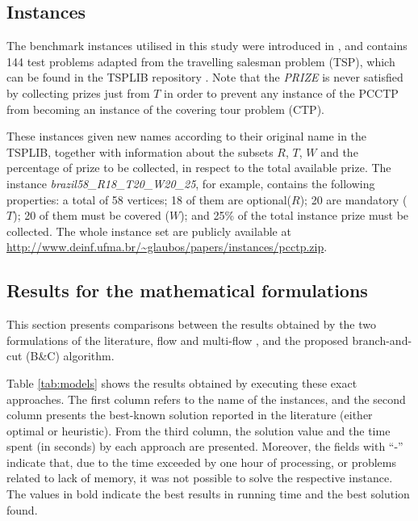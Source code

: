 \documentclass{singlecol-new}
\theoremstyle{TH}{
\newtheorem{lemma}{Lemma}
\newtheorem{theorem}[lemma]{Theorem}
\newtheorem{corrolary}[lemma]{Corrolary}
\newtheorem{conjecture}[lemma]{Conjecture}
\newtheorem{proposition}[lemma]{Proposition}
\newtheorem{claim}[lemma]{Claim}
\newtheorem{stheorem}[lemma]{Wrong Theorem}
}
\theoremstyle{THrm}{
\newtheorem{definition}{Definition}[section]
\newtheorem{question}{Question}[section]
\newtheorem{remark}{Remark}
\newtheorem{scheme}{Scheme}
}
\theoremstyle{THhit}{
\newtheorem{case}{Case}[section]
}
\begin{document}

 
\subsection{Instances}

The benchmark instances utilised in this study were introduced in \citet{silva2009problema}, and contains  144 test problems adapted from the travelling salesman problem (TSP),  which can be found in the TSPLIB repository \citep{reinelt1991tsplib}. Note that the \textit{PRIZE} is never satisfied by collecting prizes just from $T$ in order to prevent any instance of the PCCTP from becoming an instance of the covering tour problem (CTP).

These instances given new names according to their original name in the TSPLIB, together with information about the subsets $R$, $T$, $W$ and the percentage of prize to be collected, in respect to the total available prize. The instance \textit{brazil58\_R18\_T20\_W20\_25}, for example, contains the following properties: a total of 58 vertices; 18 of them are optional($R$); 20 are mandatory ($T$); 20 of them must be covered ($W$); and 25\% of the total instance prize must be collected. The whole instance set are publicly available at \url{http://www.deinf.ufma.br/~glaubos/papers/instances/pcctp.zip}.


\subsection{Results for the mathematical formulations}
This section presents comparisons between the results obtained by the two formulations of the literature, flow \citep{lyra2004problema} and multi-flow \citep{silva2009problema}, and the proposed branch-and-cut (B\&C) algorithm. 

Table \ref{tab:models} shows the results obtained by executing these exact approaches. The first column refers to the name of the instances, and the second column presents the best-known solution reported in the literature (either optimal or heuristic). From the third column, the solution value and the time spent (in seconds) by each approach are presented. Moreover, the fields with ``-'' indicate that, due to the time exceeded by one hour of processing, or problems related to lack of memory, it was not possible to solve the respective instance. The values in bold indicate the best results in running time and the best solution found.
\end{document}
